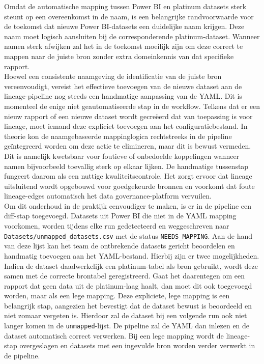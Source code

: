 Omdat de automatische mapping tussen Power BI en platinum datasets sterk steunt op een overeenkomst in de naam, is een belangrijke randvoorwaarde voor de toekomst dat nieuwe Power BI-datasets een duidelijke naam krijgen. Deze naam moet logisch aansluiten bij de corresponderende platinum-dataset. Wanneer namen sterk afwijken zal het in de toekomst moeilijk zijn om deze correct te mappen naar de juiste bron zonder extra domeinkennis van dat specifieke rapport.\\

Hoewel een consistente naamgeving de identificatie van de juiste bron vereenvoudigt, vereist het effectieve toevoegen van de nieuwe dataset aan de lineage-pipeline nog steeds een handmatige aanpassing van de YAML. Dit is momenteel de enige niet geautomatiseerde stap in de workflow. Telkens dat er een nieuw rapport of een nieuwe dataset wordt gecreëerd dat van toepassing is voor lineage, moet iemand deze expliciet toevoegen aan het configuratiebestand. In theorie kon de naamgebaseerde mappinglogica rechtstreeks in de pipeline geïntegreerd worden om deze actie te elimineren, maar dit is bewust vermeden. Dit is namelijk kwetsbaar voor foutieve of onbedoelde koppelingen wanneer namen bijvoorbeeld toevallig sterk op elkaar lijken. De handmatige tussenstap fungeert daarom als een nuttige kwaliteitscontrole. Het zorgt ervoor dat lineage uitsluitend wordt opgebouwd voor goedgekeurde bronnen en voorkomt dat foute lineage-edges automatisch het data governance-platform vervuilen.\\

Om dit onderhoud in de praktijk eenvoudiger te maken, is er in de pipeline een diff-stap toegevoegd. Datasets uit Power BI die niet in de YAML mapping voorkomen, worden tijdens elke run gedetecteerd en weggeschreven naar \texttt{Datasets/unmapped\_datasets.csv} met de status \texttt{NEEDS\_MAPPING}. Aan de hand van deze lijst kan het team de ontbrekende datasets gericht beoordelen en handmatig toevoegen aan het YAML-bestand. Hierbij zijn er twee mogelijkheden. Indien de dataset daadwerkelijk een platinum-tabel als bron gebruikt, wordt deze samen met de correcte brontabel geregistreerd. Gaat het daarentegen om een rapport dat geen data uit de platinum-laag haalt, dan moet dit ook toegevoegd worden, maar als een lege mapping. Deze expliciete, lege mapping is een belangrijk stap, aangezien het bevestigt dat de dataset bewust is beoordeeld en niet zomaar vergeten is. Hierdoor zal de dataset bij een volgende run ook niet langer komen in de \texttt{unmapped}-lijst. De pipeline zal de YAML dan inlezen en de dataset automatisch correct verwerken. Bij een lege mapping wordt de lineage-stap overgeslagen en datasets met een ingevulde bron worden verder verwerkt in de pipeline. 

